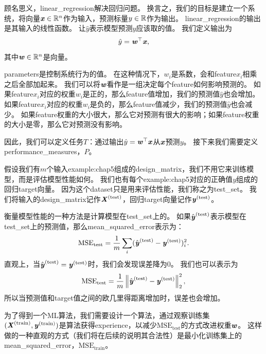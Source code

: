 顾名思义，\gls{linear_regression}解决回归问题。
换言之，我们的目标是建立一个系统，将向量$\boldsymbol{\mathit{x}}\in\mathbb{R}^n$作为输入，预测标量$y\in\mathbb{R}$作为输出。
\gls{linear_regression}的输出是其输入的线性函数。
让$\hat{y}$表示模型预测$y$应该取的值。
我们定义输出为
\begin{equation}
    \hat{y} = \boldsymbol{\mathit{w}}^\top \boldsymbol{\mathit{x}} ,
\end{equation}
其中$\boldsymbol{\mathit{w}}\in\mathbb{R}^n$是向量。

\gls{parameters}是控制系统行为的值。
在这种情况下，$w_i$是系数，会和\gls{feature}$x_i$相乘之后全部加起来。
我们可以将$\boldsymbol{\mathit{w}}$看作是一组决定每个\gls{feature}如何影响预测的。
如果\gls{feature}$x_i$对应的权重$w_i$是正的，那么\gls{feature}值增加，我们的预测值$\hat{y}$也会增加。
如果\gls{feature}$x_i$对应的权重$w_i$是负的，那么\gls{feature}值减少，我们的预测值$\hat{y}$也会减少。
如果\gls{feature}权重的大小很大，那么它对预测有很大的影响；如果\gls{feature}权重的大小是零，那么它对预测没有影响。


因此，我们可以定义任务$T$：通过输出$\hat{y} = \boldsymbol{\mathit{w}}^\top \boldsymbol{\mathit{x}}$从$\boldsymbol{\mathit{x}}$预测$y$。
接下来我们需要定义\gls{performance_measures}，$P$。

假设我们有$m$个输入\gls{example:chap5}组成的\gls{design_matrix}，我们不用它来训练模型，而是评估模型性能如何。
我们也有每个\gls{example:chap5}对应的正确值$y$组成的回归\gls{target}向量。
因为这个\gls{dataset}只是用来评估性能，我们称之为\gls{test_set}。
我们将输入的\gls{design_matrix}记作$\boldsymbol{\mathit{X}}^{\text{(test)}}$，回归\gls{target}向量记作$\boldsymbol{\mathit{y}}^{(\text{test})}$。

衡量模型性能的一种方法是计算模型在\gls{test_set}上的。
如果$\hat{\boldsymbol{\mathit{y}}}^{(\text{test})}$表示模型在\gls{test_set}上的预测值，那么\gls{mean_squared_error}表示为：
\begin{equation}
    \text{MSE}_{\text{test}} = \frac{1}{m} \sum_i ( \hat{\boldsymbol{\mathit{y}}}^{(\text{test})} - \boldsymbol{\mathit{y}}^{(\text{test})})_i^2.
\end{equation}
直观上，当$\hat{\boldsymbol{\mathit{y}}}^{(\text{test})} = \boldsymbol{\mathit{y}}^{(\text{test})}$时，我们会发现误差降为$0$。
我们也可以表示为
\begin{equation}
    \text{MSE}_{\text{test}} = \frac{1}{m} \left\lVert \hat{\boldsymbol{\mathit{y}}}^{(\text{test})} - \boldsymbol{\mathit{y}}^{(\text{test})}\right\rVert_2^2,
\end{equation}
所以当预测值和\gls{target}值之间的欧几里得距离增加时，误差也会增加。

为了得到一个\gls{ML}算法，我们需要设计一个算法，通过观察训练集$(\boldsymbol{\mathit{X}}^{(\text{train})},\boldsymbol{\mathit{y}}^{(\text{train})})$是算法获得\gls{experience}，以减少$\text{MSE}_{\text{test}}$的方式改进权重$\boldsymbol{\mathit{w}}$。
这样做的一种直观的方式（我们将在后续的说明其合法性）是最小化训练集上的\gls{mean_squared_error}，$\text{MSE}_{\text{train}}$。

